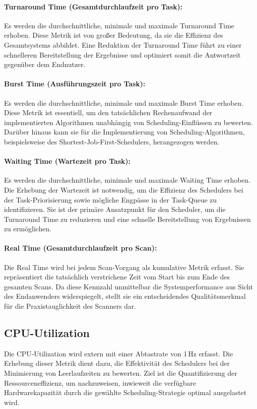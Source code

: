 \begin{sloppypar}
\paragraph{Turnaround Time (Gesamtdurchlaufzeit pro Task):}
Es werden die durchschnittliche, minimale und maximale Turnaround Time erhoben.
Diese Metrik ist von großer Bedeutung, da sie die Effizienz des Gesamtsystems abbildet.
Eine Reduktion der Turnaround Time führt zu einer schnelleren Bereitstellung
der Ergebnisse und optimiert somit die Antwortzeit gegenüber dem Endnutzer.

\paragraph{Burst Time (Ausführungszeit pro Task):}
Es werden die durchschnittliche, minimale und maximale Burst Time erhoben.
Diese Metrik ist essentiell, um den tatsächlichen Rechenaufwand der implementierten Algorithmen
unabhängig von Scheduling-Einflüssen zu bewerten.
Darüber hinaus kann sie für die Implementierung von Scheduling-Algorithmen,
beispielsweise des Shortest-Job-First-Schedulers, herangezogen werden.

\paragraph{Waiting Time (Wartezeit pro Task):}
Es werden die durchschnittliche, minimale und maximale Waiting Time erhoben.
Die Erhebung der Wartezeit ist notwendig, um die Effizienz des Schedulers bei der Task-Priorisierung
sowie mögliche Engpässe in der Task-Queue zu identifizieren.
Sie ist der primäre Ansatzpunkt für den Scheduler,
um die Turnaround Time zu reduzieren und eine schnelle Bereitstellung von Ergebnissen zu ermöglichen.

\paragraph{Real Time (Gesamtdurchlaufzeit pro Scan):}
Die Real Time wird bei jedem Scan-Vorgang als kumulative Metrik erfasst.
Sie repräsentiert die tatsächlich verstrichene Zeit vom Start bis zum Ende des gesamten Scans.
Da diese Kennzahl unmittelbar die Systemperformance aus Sicht des Endanwenders widerspiegelt,
stellt sie ein entscheidendes Qualitätsmerkmal für die Praxistauglichkeit des Scanners dar.

\subsection{\acs{CPU}-Utilization}
Die \acs{CPU}-Utilization wird extern mit einer Abtastrate von 1\,Hz erfasst.
Die Erhebung dieser Metrik dient dazu, die Effektivität des Schedulers bei der Minimierung von Leerlaufzeiten zu bewerten.
Ziel ist die Quantifizierung der Ressourceneffizienz, um nachzuweisen,
inwieweit die verfügbare Hardwarekapazität durch die gewählte Scheduling-Strategie optimal ausgelastet wird.


\end{sloppypar}
